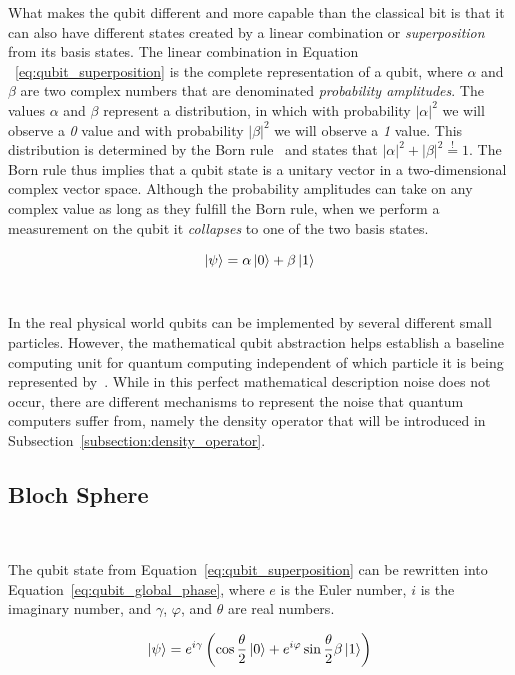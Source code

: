 What makes the qubit different and more capable than
the classical bit is that it can also have different states
created by a linear combination or \textit{superposition} from
its basis states. The linear combination in Equation
~\ref{eq:qubit_superposition} is the complete representation
of a qubit, where \(\alpha\) and \(\beta\) are two complex numbers that
are denominated \textit{probability amplitudes}.
The values \(\alpha\) and \(\beta\) represent a distribution, in which
with probability \(|\alpha|^2\) we will observe a \textit{0}
value and with probability \(|\beta|^2\) we will observe a
\textit{1} value. This distribution is determined by the
Born rule~\cite{born_quantenmechanik_1926} and states that \(|\alpha|^2 + |\beta|^2 \stackrel{!}{=} 1\).
The Born rule thus implies that a qubit state is a unitary vector in
a two-dimensional complex vector space. Although the
probability amplitudes can take on any complex value as long
as they fulfill the Born rule, when we perform a measurement
on the qubit it \textit{collapses} to one of the two basis
states. \

\begin{equation}\label{eq:qubit_superposition}
  \ket{\psi} = \alpha\ket{0} + \beta\ket{1}
\end{equation} \

In the real physical world qubits can be implemented by
several different small particles. However, the mathematical
qubit abstraction helps establish a baseline computing unit
for quantum computing independent of which particle it is
being represented by~\cite{nielsen_quantum_2010}. While in this perfect
mathematical description noise does not occur, there are
different mechanisms to represent the noise that quantum
computers suffer from, namely the density operator that will
be introduced in Subsection~\ref{subsection:density_operator}. \

\subsection{Bloch Sphere} \

The qubit state from Equation~\ref{eq:qubit_superposition} can be
rewritten into Equation~\ref{eq:qubit_global_phase}, where \(e\)
is the Euler number, \(i\) is the imaginary number, and \(\gamma\),
\(\varphi\), and \(\theta\) are real numbers. \

\begin{equation}\label{eq:qubit_global_phase}
  \ket{\psi} = e^{i\gamma} \left( \cos{\frac{\theta}{2}}\ket{0} + e^{i\varphi}\sin{\frac{\theta}{2}}\beta\ket{1} \right)
\end{equation} \

